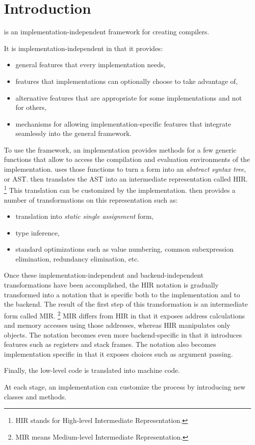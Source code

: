 \chapter{Introduction}
%

\sysname{} is an implementation-independent framework for creating
\commonlisp{} compilers. 

It is implementation-independent in that it provides:

\begin{itemize}
\item general features that every implementation needs,
\item features that implementations can optionally choose to take
  advantage of, 
\item alternative features that are appropriate for some
  implementations and not for others,
\item mechanisms for allowing implementation-specific features that
  integrate seamlessly into the general framework.
\end{itemize}

To use the framework, an implementation provides methods for a few
generic functions that allow \sysname{} to access the compilation and
evaluation environments of the implementation.  \sysname{} uses those
functions to turn a form into an \emph{abstract syntax tree}, or AST.
 \sysname{} then translates the AST
into an intermediate representation called HIR.%
\footnote{HIR stands for High-level Intermediate Representation.}
This translation can be customized by the implementation.  \sysname{}
then provides a number of transformations on this representation such
as:

\begin{itemize}
\item translation into \emph{static single assignment} form,
\item type inference,
\item standard optimizations such as value numbering, common
  subexpression elimination, redundancy elimination, etc.
\end{itemize}

Once these implementation-independent and backend-independent
transformations have been accomplished, the HIR notation is gradually
transformed into a notation that is specific both to the
implementation and to the backend.  The result of the first step of
this transformation is an intermediate form called MIR.%
\footnote{MIR means Medium-level Intermediate Representation.}  MIR
differs from HIR in that it exposes address calculations and memory
accesses using those addresses, whereas HIR manipulates only
\commonlisp{} objects.  The notation becomes even more
backend-specific in that it introduces features such as registers and
stack frames.  The notation also becomes implementation specific in
that it exposes choices such as argument passing.

Finally, the low-level code is translated into machine code.

At each stage, an implementation can customize the process by
introducing new classes and methods. 
